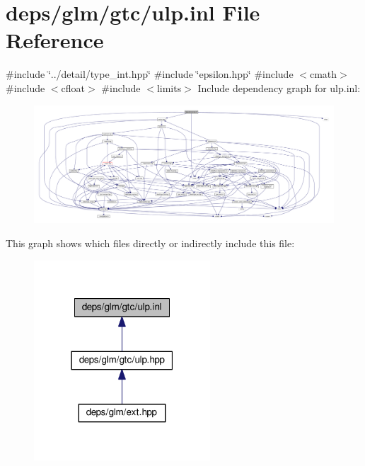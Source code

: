 \hypertarget{ulp_8inl}{}\section{deps/glm/gtc/ulp.inl File Reference}
\label{ulp_8inl}
{\ttfamily \#include \char`\"{}../detail/type\+\_\+int.\+hpp\char`\"{}}\newline
{\ttfamily \#include \char`\"{}epsilon.\+hpp\char`\"{}}\newline
{\ttfamily \#include $<$cmath$>$}\newline
{\ttfamily \#include $<$cfloat$>$}\newline
{\ttfamily \#include $<$limits$>$}\newline
Include dependency graph for ulp.\+inl\+:
\nopagebreak
\begin{figure}[H]
\begin{center}
\leavevmode
\includegraphics[width=350pt]{d2/d4b/ulp_8inl__incl}
\end{center}
\end{figure}
This graph shows which files directly or indirectly include this file\+:
\nopagebreak
\begin{figure}[H]
\begin{center}
\leavevmode
\includegraphics[width=187pt]{d2/db8/ulp_8inl__dep__incl}
\end{center}
\end{figure}
